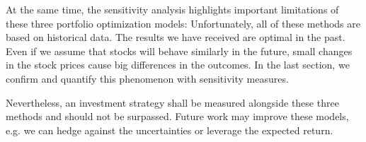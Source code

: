 \documentclass[a4paper, english, 11pt, onecolumn, oneside, final]{article}
\numberwithin{equation}{section}   %
\theoremstyle{plain}
\theoremstyle{definition}
\theoremstyle{remark}
\begin{document}
\medskip At the same time, the sensitivity analysis highlights important limitations of these three portfolio optimization models: Unfortunately, all of these methods are based on historical data. The results we have received are optimal in the past. Even if we assume that stocks will behave similarly in the future, small changes in the stock prices cause big differences in the outcomes. In the last section, we confirm and quantify this phenomenon with sensitivity measures.

\medskip Nevertheless, an investment strategy shall be measured alongside these three methods and should not be surpassed. Future work may improve these models, e.g. we can hedge against the uncertainties or leverage the expected return.


\label{References}

\end{document}
